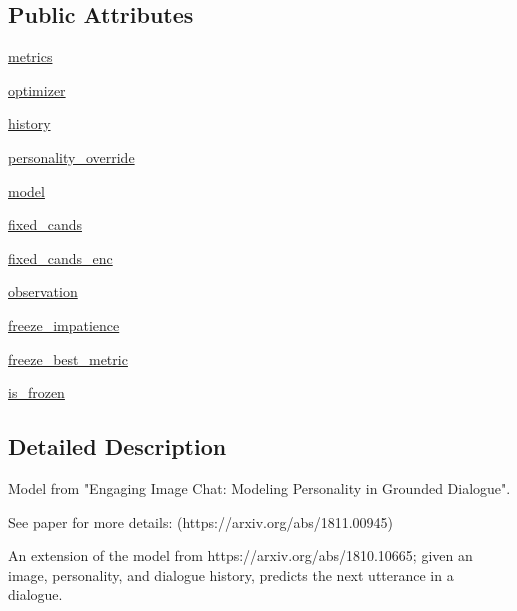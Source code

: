 \subsection*{Public Attributes}
\begin{DoxyCompactItemize}
\item 
\hyperlink{classtransresnet__multimodal_1_1transresnet__multimodal_1_1TransresnetMultimodalAgent_a06001606cc178b20680cacf41f261d18}{metrics}
\item 
\hyperlink{classtransresnet__multimodal_1_1transresnet__multimodal_1_1TransresnetMultimodalAgent_aeb49f489319f9fc7e0f70954c2dfe41b}{optimizer}
\item 
\hyperlink{classtransresnet__multimodal_1_1transresnet__multimodal_1_1TransresnetMultimodalAgent_ab08987182508e904fdda2c0aa587c2c5}{history}
\item 
\hyperlink{classtransresnet__multimodal_1_1transresnet__multimodal_1_1TransresnetMultimodalAgent_a8c5584904283db949a2c79255720a7f1}{personality\+\_\+override}
\item 
\hyperlink{classtransresnet__multimodal_1_1transresnet__multimodal_1_1TransresnetMultimodalAgent_a8423e370ab64b18f9ff32f009e8c6c35}{model}
\item 
\hyperlink{classtransresnet__multimodal_1_1transresnet__multimodal_1_1TransresnetMultimodalAgent_a83e10afeba8c961541a5667961476ce3}{fixed\+\_\+cands}
\item 
\hyperlink{classtransresnet__multimodal_1_1transresnet__multimodal_1_1TransresnetMultimodalAgent_af63e8b94c9f0153a9fd6d83d7d59223f}{fixed\+\_\+cands\+\_\+enc}
\item 
\hyperlink{classtransresnet__multimodal_1_1transresnet__multimodal_1_1TransresnetMultimodalAgent_a6e4eda632ec6da99bd2504eeeb049784}{observation}
\item 
\hyperlink{classtransresnet__multimodal_1_1transresnet__multimodal_1_1TransresnetMultimodalAgent_abbdc12820c5d619eedbb4e9a2e8d04c4}{freeze\+\_\+impatience}
\item 
\hyperlink{classtransresnet__multimodal_1_1transresnet__multimodal_1_1TransresnetMultimodalAgent_afa59250409c09f38a49691e168bcf351}{freeze\+\_\+best\+\_\+metric}
\item 
\hyperlink{classtransresnet__multimodal_1_1transresnet__multimodal_1_1TransresnetMultimodalAgent_a2af6bf0aae641fc5c698b3a9f293eb79}{is\+\_\+frozen}
\end{DoxyCompactItemize}


\subsection{Detailed Description}
\begin{DoxyVerb}Model from "Engaging Image Chat: Modeling Personality in Grounded Dialogue".

See paper for more details: (https://arxiv.org/abs/1811.00945)

An extension of the model from https://arxiv.org/abs/1810.10665; given
an image, personality, and dialogue history, predicts the next utterance
in a dialogue.
\end{DoxyVerb}
 

